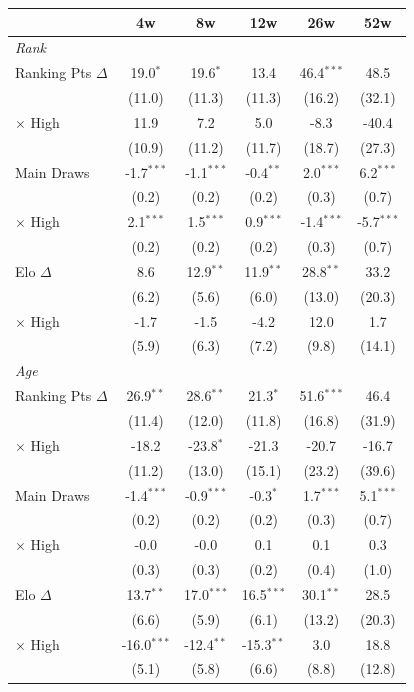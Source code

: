\begin{tabular}{l*{5}{c}}
\toprule
 & 4w & 8w & 12w & 26w & 52w \\
\midrule
\multicolumn{6}{l}{\textit{Rank}} \\
  Ranking Pts $\Delta$ & 19.0$^{*}$ & 19.6$^{*}$ & 13.4 & 46.4$^{***}$ & 48.5 \\
  & (11.0) & (11.3) & (11.3) & (16.2) & (32.1) \\
  $\times$ High & 11.9 & 7.2 & 5.0 & -8.3 & -40.4 \\
  & (10.9) & (11.2) & (11.7) & (18.7) & (27.3) \\[0.3em]
  Main Draws & -1.7$^{***}$ & -1.1$^{***}$ & -0.4$^{**}$ & 2.0$^{***}$ & 6.2$^{***}$ \\
  & (0.2) & (0.2) & (0.2) & (0.3) & (0.7) \\
  $\times$ High & 2.1$^{***}$ & 1.5$^{***}$ & 0.9$^{***}$ & -1.4$^{***}$ & -5.7$^{***}$ \\
  & (0.2) & (0.2) & (0.2) & (0.3) & (0.7) \\[0.3em]
  Elo $\Delta$ & 8.6 & 12.9$^{**}$ & 11.9$^{**}$ & 28.8$^{**}$ & 33.2 \\
  & (6.2) & (5.6) & (6.0) & (13.0) & (20.3) \\
  $\times$ High & -1.7 & -1.5 & -4.2 & 12.0 & 1.7 \\
  & (5.9) & (6.3) & (7.2) & (9.8) & (14.1) \\[0.3em]
\midrule
\multicolumn{6}{l}{\textit{Age}} \\
  Ranking Pts $\Delta$ & 26.9$^{**}$ & 28.6$^{**}$ & 21.3$^{*}$ & 51.6$^{***}$ & 46.4 \\
  & (11.4) & (12.0) & (11.8) & (16.8) & (31.9) \\
  $\times$ High & -18.2 & -23.8$^{*}$ & -21.3 & -20.7 & -16.7 \\
  & (11.2) & (13.0) & (15.1) & (23.2) & (39.6) \\[0.3em]
  Main Draws & -1.4$^{***}$ & -0.9$^{***}$ & -0.3$^{*}$ & 1.7$^{***}$ & 5.1$^{***}$ \\
  & (0.2) & (0.2) & (0.2) & (0.3) & (0.7) \\
  $\times$ High & -0.0 & -0.0 & 0.1 & 0.1 & 0.3 \\
  & (0.3) & (0.3) & (0.2) & (0.4) & (1.0) \\[0.3em]
  Elo $\Delta$ & 13.7$^{**}$ & 17.0$^{***}$ & 16.5$^{***}$ & 30.1$^{**}$ & 28.5 \\
  & (6.6) & (5.9) & (6.1) & (13.2) & (20.3) \\
  $\times$ High & -16.0$^{***}$ & -12.4$^{**}$ & -15.3$^{**}$ & 3.0 & 18.8 \\
  & (5.1) & (5.8) & (6.6) & (8.8) & (12.8) \\[0.3em]
\midrule
\bottomrule
\end{tabular}
